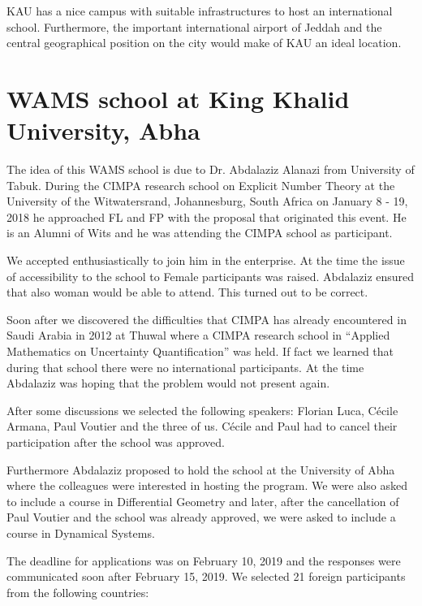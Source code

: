 \documentclass[12pt,a4paper]{scrartcl}
\begin{document}
KAU has a nice campus with suitable infrastructures to host an international school. Furthermore, the important international airport of Jeddah and the central geographical position on the city would make of KAU an ideal location. 




\section{WAMS school at King Khalid University, Abha}

The idea of this WAMS school is due to Dr. Abdalaziz Alanazi from University of Tabuk. During the CIMPA research school on
Explicit Number Theory at the University of the Witwatersrand, Johannesburg, South Africa on January 8 - 19, 2018 he approached FL and FP with the proposal that originated this event. He is an Alumni of
Wits and he was attending the CIMPA school as participant.

We accepted enthusiastically to join him in the enterprise. At the time the issue of accessibility to the school to Female participants was raised. Abdalaziz ensured that also woman would be able to attend. This turned out to be correct.

Soon after we discovered the difficulties that CIMPA has already encountered in Saudi Arabia in 2012 at Thuwal where a CIMPA research school in ``Applied Mathematics on Uncertainty Quantification'' was held.
If fact we learned that during that school there were no international participants. At the time Abdalaziz was hoping that the problem would not present again.

After some discussions we selected the following speakers: Florian Luca, C\'ecile Armana, Paul Voutier and the three of us. C\'ecile and Paul had to cancel their participation after the school was approved.

Furthermore Abdalaziz proposed to hold the school at the University of Abha where the colleagues were interested in hosting the program. We were also asked to include a course in Differential Geometry and later, after the cancellation of Paul Voutier and the school was already approved, we were asked to include a course in Dynamical Systems. 

The deadline for applications was on  February 10, 2019 and the responses were communicated soon after February 15, 2019. 
We selected 21 foreign participants from the following countries:
\end{document}
